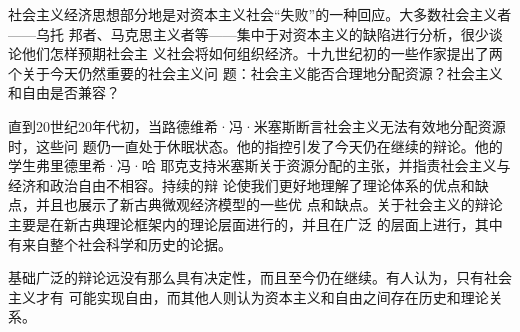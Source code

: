 社会主义经济思想部分地是对资本主义社会“失败”的一种回应。大多数社会主义者——乌托
邦者、马克思主义者等——集中于对资本主义的缺陷进行分析，很少谈论他们怎样预期社会主
义社会将如何组织经济。十九世纪初的一些作家提出了两个关于今天仍然重要的社会主义问
题：社会主义能否合理地分配资源？社会主义和自由是否兼容？

直到20世纪20年代初，当路德维希·冯·米塞斯断言社会主义无法有效地分配资源时，这些问
题仍一直处于休眠状态。他的指控引发了今天仍在继续的辩论。他的学生弗里德里希·冯·哈
耶克支持米塞斯关于资源分配的主张，并指责社会主义与经济和政治自由不相容。持续的辩
论使我们更好地理解了理论体系的优点和缺点，并且也展示了新古典微观经济模型的一些优
点和缺点。关于社会主义的辩论主要是在新古典理论框架内的理论层面进行的，并且在广泛
的层面上进行，其中有来自整个社会科学和历史的论据。

基础广泛的辩论远没有那么具有决定性，而且至今仍在继续。有人认为，只有社会主义才有
可能实现自由，而其他人则认为资本主义和自由之间存在历史和理论关系。

